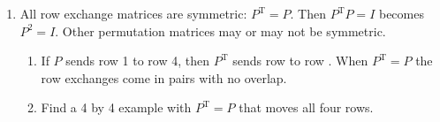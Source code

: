 \documentclass[14pt, a4paper]{article}
\begin{document}
\begin{enumerate}[resume]
    \item All row exchange matrices are symmetric: $P^{\mathrm{T}} = P$. Then $P^{\mathrm{T}}P = I$ becomes $P^2 = I$. Other permutation matrices may or may not be symmetric.
          \begin{enumerate}
              \item If $P$ sends row 1 to row 4, then $P^{\mathrm{T}}$ sends row \underline{\hspace{2cm}} to row \underline{\hspace{2cm}}. When $P^{\mathrm{T}} = P$ the row exchanges come in pairs with no overlap.
              \item Find a 4 by 4 example with $P^{\mathrm{T}} = P$ that moves all four rows.
          \end{enumerate}
\end{enumerate}
\end{document}
